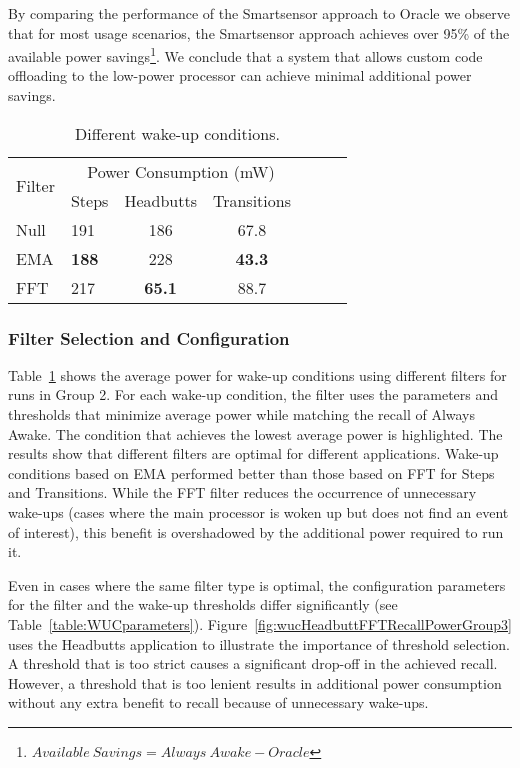 By comparing the performance of the Smartsensor approach to Oracle we
observe that for most usage scenarios, the Smartsensor approach
achieves over 95\% of the available power
savings\footnote{$Available\:Savings=Always\:Awake - Oracle$}.
We conclude that a system that allows
custom code offloading to the low-power processor can achieve minimal
additional power savings.


\begin{table}[t]
\centering
{\small
    \begin{tabular}{|l|l|c|c|c|c|c|}
	\hline
    \multirow{2}{*}{Filter}    	& \multicolumn{3}{c|}{Power Consumption (mW)} \\ \cline{2-4}
							& Steps	& Headbutts	& Transitions 	\\ \hline
    Null     				& 191		& 186		& 67.8 			\\ \hline
	EMA   				& {\bf 188}		& 228		& {\bf 43.3} 			\\ \hline
	FFT 				& 217		& {\bf 65.1} 		& 88.7 			\\ \hline
	
    \end{tabular}
}
	\caption{Different wake-up conditions.}
	\label{table:WUCfilters}
\end{table}

\subsubsection{Filter Selection and Configuration}

Table~\ref{table:WUCfilters} shows the average power for wake-up
conditions using different filters for runs in Group 2.  For each
wake-up condition, the filter uses the parameters and thresholds that
minimize average power while matching the recall of Always Awake.  The
condition that achieves the lowest average power is highlighted.  The
results show that different filters are optimal for different
applications.  Wake-up conditions based on EMA performed better than
those based on FFT for Steps and Transitions.  While the FFT filter
reduces the occurrence of unnecessary wake-ups (cases where
the main processor is woken up but does not find an event of
interest), this benefit is overshadowed by the additional power
required to run it.

Even in cases where the same filter type is optimal, the configuration
parameters for the filter and the wake-up thresholds differ
significantly (see Table~\ref{table:WUCparameters}).
Figure~\ref{fig:wucHeadbuttFFTRecallPowerGroup3} uses the Headbutts
application to illustrate the importance of threshold selection.  A
threshold that is too strict causes a significant drop-off in the
achieved recall.  However, a threshold that is too lenient results in
additional power consumption without any extra benefit to recall
because of unnecessary wake-ups.


